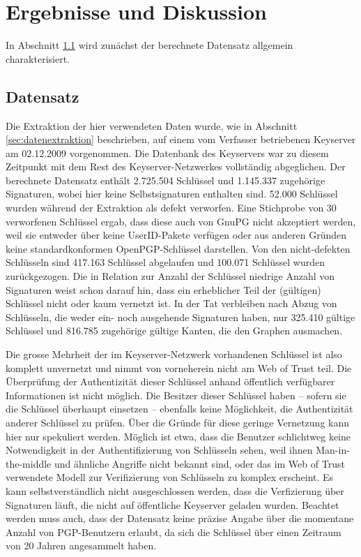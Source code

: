 
\chapter{Ergebnisse und Diskussion}
\label{ch:Ergebnisse}
In Abschnitt \ref{sec:datensatz} wird zun\"achst der berechnete
Datensatz allgemein charakterisiert. 

\section{Datensatz}
\label{sec:datensatz}

Die Extraktion der hier verwendeten Daten wurde, wie in Abschnitt
\ref{sec:datenextraktion} beschrieben, auf einem vom
Verfasser betriebenen Keyserver am 02.12.2009 vorgenommen. Die
Datenbank des Keyservers war zu diesem Zeitpunkt mit dem Rest des
Keyserver-Netzwerkes vollst\"andig abgeglichen. Der berechnete
Datensatz enth\"alt 2.725.504 Schl\"ussel und 1.145.337 zugeh\"orige
Signaturen, wobei hier keine Selbstsignaturen enthalten sind. 52.000
Schl\"ussel wurden w\"ahrend der Extraktion als defekt verworfen. Eine
Stichprobe von 30 verworfenen Schl\"ussel ergab, dass diese auch von
GnuPG nicht akzeptiert werden, weil sie entweder \"uber keine
UserID-Pakete verf\"ugen oder aus anderen Gr\"unden keine
standardkonformen OpenPGP-Schl\"ussel darstellen. Von den
nicht-defekten Schl\"usseln sind 417.163 Schl\"ussel abgelaufen und
100.071 Schl\"ussel wurden zur\"uckgezogen. Die in Relation zur Anzahl
der Schl\"ussel niedrige Anzahl von Signaturen weist schon darauf hin,
dass ein erheblicher Teil der (g\"ultigen) Schl\"ussel nicht oder kaum
vernetzt ist. In der Tat verbleiben nach Abzug von Schl\"usseln, die
weder ein- noch ausgehende Signaturen haben, nur 325.410 g\"ultige
Schl\"ussel und 816.785 zugeh\"orige g\"ultige Kanten, die den Graphen
ausmachen.

Die grosse Mehrheit der im Keyserver-Netzwerk vorhandenen Schl\"ussel
ist also komplett unvernetzt und nimmt von vorneherein nicht am Web of
Trust teil. Die \"Uberpr\"ufung der Authentizit\"at dieser Schl\"ussel
anhand \"offentlich verf\"ugbarer Informationen ist nicht
m\"oglich. Die Besitzer dieser Schl\"ussel haben -- sofern sie die
Schl\"ussel \"uberhaupt einsetzen -- ebenfalls keine M\"oglichkeit,
die Authentizit\"at anderer Schl\"ussel zu pr\"ufen. \"Uber die
Gr\"unde f\"ur diese geringe Vernetzung kann hier nur spekuliert
werden. M\"oglich ist etwa, dass die Benutzer schlichtweg keine
Notwendigkeit in der Authentifizierung von Schl\"usseln sehen, weil
ihnen Man-in-the-middle und \"ahnliche Angriffe nicht bekannt sind,
oder das im Web of Trust verwendete Modell zur Verifizierung von
Schl\"usseln zu komplex erscheint. Es kann selbstverst\"andlich nicht
ausgeschlossen werden, dass die Verfizierung \"uber Signaturen
l\"auft, die nicht auf \"offentliche Keyserver geladen
wurden. Beachtet werden muss auch, dass der Datensatz keine pr\"azise
Angabe \"uber die momentane Anzahl von PGP-Benutzern erlaubt, da sich
die Schl\"ussel \"uber einen Zeitraum von 20 Jahren angesammelt haben.

